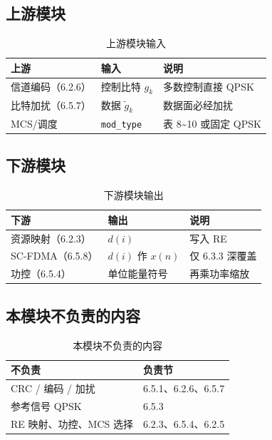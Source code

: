 \documentclass[11pt,a4paper]{ctexart}
\begin{document}
\subsection{上游模块}

\begin{longtable}{L{4.2cm}L{4.5cm}L{5.5cm}}
\caption{上游模块输入\label{tab:656-up}} \\
\toprule
\textbf{上游} & \textbf{输入} & \textbf{说明} \\
\midrule
信道编码（6.2.6） & 控制比特 $g_k$ & 多数控制直接 QPSK \\
比特加扰（6.5.7） & 数据 $\tilde{g}_k$ & 数据面必经加扰 \\
MCS/调度 & \texttt{mod\_type} & 表 8\textasciitilde 10 或固定 QPSK \\
\bottomrule
\end{longtable}

\subsection{下游模块}

\begin{longtable}{L{4.2cm}L{4.5cm}L{5.5cm}}
\caption{下游模块输出\label{tab:656-down}} \\
\toprule
\textbf{下游} & \textbf{输出} & \textbf{说明} \\
\midrule
资源映射（6.2.3） & $d(i)$ & 写入 RE \\
SC-FDMA（6.5.8） & $d(i)$ 作 $x(n)$ & 仅 6.3.3 深覆盖 \\
功控（6.5.4） & 单位能量符号 & 再乘功率缩放 \\
\bottomrule
\end{longtable}

\subsection{本模块不负责的内容}

\begin{longtable}{L{5.5cm}L{8.5cm}}
\caption{本模块不负责的内容\label{tab:656-out}} \\
\toprule
\textbf{不负责} & \textbf{负责节} \\
\midrule
CRC / 编码 / 加扰 & 6.5.1、6.2.6、6.5.7 \\
参考信号 QPSK & 6.5.3 \\
RE 映射、功控、MCS 选择 & 6.2.3、6.5.4、6.2.5 \\
\bottomrule
\end{longtable}
\end{document}
